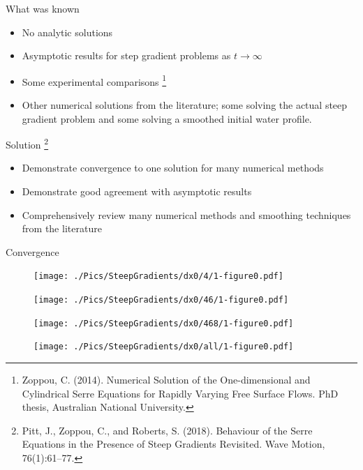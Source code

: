 \documentclass[handout]{beamer}
\newcommand\blfootnote[1]{%
	\begingroup
	\renewcommand\thefootnote{}\footnote{#1}%
	\addtocounter{footnote}{-1}%
	\endgroup
}
\begin{document}
\begin{frame}{What was known}
	\begin{itemize}
		\item No analytic solutions
		\item Asymptotic results for step gradient problems as $t \rightarrow \infty$
		\item Some experimental comparisons \footnote{Zoppou, C. (2014).
			Numerical Solution of the One-dimensional and Cylindrical
			Serre Equations for Rapidly Varying Free Surface Flows. PhD thesis, Australian National University.}
		\item Other numerical solutions from the literature; some solving the actual steep gradient problem and some solving a smoothed initial water profile.
		\end{itemize}
\end{frame}

\begin{frame}{Solution}
	\blfootnote{Pitt, J., Zoppou, C., and Roberts, S. (2018).
		Behaviour of the Serre Equations in the Presence of Steep
		Gradients Revisited.
		Wave Motion, 76(1):61–77.}
	\begin{itemize}
		\item Demonstrate convergence to one solution for many numerical methods
		\item Demonstrate good agreement with asymptotic results
		\item Comprehensively review many numerical methods and smoothing techniques from the literature
	\end{itemize}
	
\end{frame}

\begin{frame}{Convergence}
		\begin{figure}
			\texttt{[image: ./Pics/SteepGradients/dx0/4/1-figure0.pdf]}
		\end{figure}
\end{frame}
\begin{frame}
	\begin{figure}
		\texttt{[image: ./Pics/SteepGradients/dx0/46/1-figure0.pdf]}
	\end{figure}
\end{frame}
\begin{frame}
	\begin{figure}
		\texttt{[image: ./Pics/SteepGradients/dx0/468/1-figure0.pdf]}
	\end{figure}
\end{frame}
\begin{frame}
	\begin{figure}
		\texttt{[image: ./Pics/SteepGradients/dx0/all/1-figure0.pdf]}
	\end{figure}
\end{frame}
\end{document}
